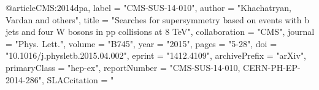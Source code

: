 @article{CMS:2014dpa,
      label          = "CMS-SUS-14-010",
      author         = "Khachatryan, Vardan and others",
      title          = "{Searches for supersymmetry based on events with b jets
                        and four W bosons in pp collisions at 8 TeV}",
      collaboration  = "CMS",
      journal        = "Phys. Lett.",
      volume         = "B745",
      year           = "2015",
      pages          = "5-28",
      doi            = "10.1016/j.physletb.2015.04.002",
      eprint         = "1412.4109",
      archivePrefix  = "arXiv",
      primaryClass   = "hep-ex",
      reportNumber   = "CMS-SUS-14-010, CERN-PH-EP-2014-286",
      SLACcitation   = "%
}


